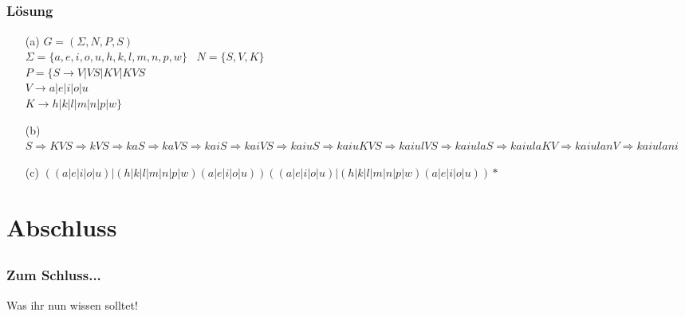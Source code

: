 \subsection*{}
\begin{frame}
	\frametitle{Lösung}
	\begin{enumerate}
		\item[(a)] $G = (\Sigma, N, P, S)$ \\
		$\Sigma=\{a,e,i,o,u,h,k,l,m,n,p,w\}$ \ $N=\{S,V,K \}$ \\
		$P=\{ S \rightarrow V|VS|KV|KVS $ \\
				$ V \rightarrow a|e|i|o|u$ \\
				$ K \rightarrow h|k|l|m|n|p|w \}$
		\pause
		\item[(b)] $S \Rightarrow KVS \Rightarrow kVS \Rightarrow kaS \Rightarrow kaVS \Rightarrow kaiS \Rightarrow kaiVS \Rightarrow kaiuS \Rightarrow kaiuKVS \Rightarrow kaiulVS \Rightarrow kaiulaS \Rightarrow kaiulaKV \Rightarrow kaiulanV \Rightarrow kaiulani$
		\pause
		\item[(c)] $((a|e|i|o|u)|(h|k|l|m|n|p|w)(a|e|i|o|u)) 
((a|e|i|o|u)|(h|k|l|m|n|p|w)(a|e|i|o|u))*$
	\end{enumerate}
\end{frame}



\section{Abschluss}
\subsection*{}
\begin{frame}
	\frametitle{Zum Schluss...}
	\begin{block}{Was ihr nun wissen solltet!}
	\begin{itemize}
    \end{itemize}
   	\end{block}

\end{frame}